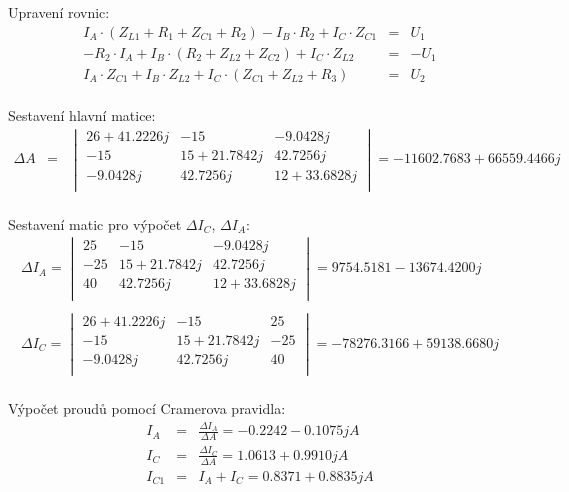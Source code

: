 \documentclass[a4paper,oneside,13pt]{article}
\begin{document}
	Upravení rovnic:
	\begin{eqnarray*}
		I_{A} \cdot (Z_{L1} + R_{1} + Z_{C1} + R_{2}) - I_{B} \cdot R_{2} + I_{C} \cdot Z_{C1} & = & U_{1} \\
		-R_{2} \cdot I_{A} + I_{B} \cdot (R_{2} + Z_{L2} + Z_{C2}) + I_{C} \cdot Z_{L2} & = & -U_{1} \\
		I_{A} \cdot Z_{C1} + I_{B} \cdot Z_{L2} + I_{C} \cdot (Z_{C1} + Z_{L2} + R_{3}) & = & U_{2} \\
	\end{eqnarray*}

	Sestavení hlavní matice:
	\begin{eqnarray*}	
		\Delta A & = &
		\begin{vmatrix}
			26 + 41.2226j & -15 & -9.0428j \\
			-15 & 15 + 21.7842j & 42.7256j \\
			-9.0428j & 42.7256j & 12 + 33.6828j \\ 
		\end{vmatrix} =  -11602.7683 + 66559.4466j \\
	\end{eqnarray*}

	Sestavení matic pro výpočet $\Delta I_{C}$, $\Delta I_{A}$:
	\begin{eqnarray*}
		\Delta I_{A} =
		\begin{vmatrix}
			25 & -15 & -9.0428j \\
			-25 & 15 + 21.7842j & 42.7256j \\
			40 & 42.7256j & 12 + 33.6828j \\ 
		\end{vmatrix} =  9754.5181 - 13674.4200j \\
		\\
		\Delta I_{C} =
		\begin{vmatrix}
			26 + 41.2226j & -15 & 25 \\
			-15 & 15 + 21.7842j & -25 \\
			-9.0428j & 42.7256j & 40 \\ 
		\end{vmatrix} = -78276.3166 + 59138.6680j \\
	\end{eqnarray*}

	Výpočet proudů pomocí Cramerova pravidla:
	\begin{eqnarray*}
		I_{A} & = & \frac{\Delta I_{A}}{\Delta A} = -0.2242 - 0.1075jA \\
		I_{C} & = & \frac{\Delta I_{C}}{\Delta A} = 1.0613 + 0.9910jA \\
		I_{C1} & = & I_{A} + I_{C} = 0.8371 + 0.8835jA \\
	\end{eqnarray*}
\end{document}
